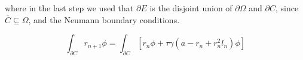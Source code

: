 \noindent
where in the last step we used that $\partial E$ is the disjoint union of $\partial \Omega$ and $\partial C$, since $\overline{C} \subseteq \Omega$, and the Neumann boundary conditions.

\begin{equation}
    \int_{\partial C} r_{n + 1} \phi = \int_{\partial C} \left[ r_{n} \phi + \tau \gamma \left( a - r_{n} + r_{n}^{2}l_{n} \right) \phi \right]
\end{equation}